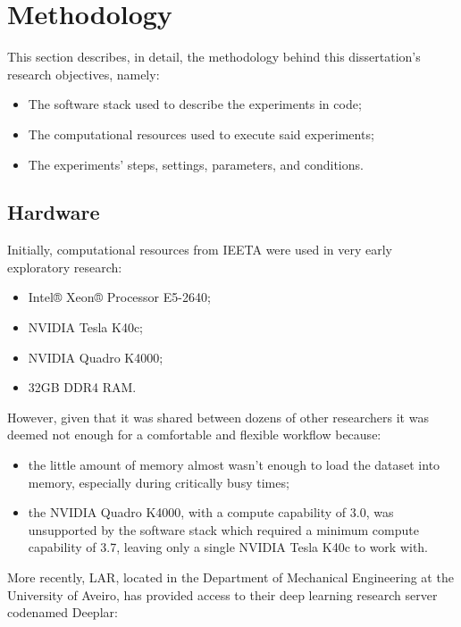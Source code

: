 \chapter{Methodology}
\label{chapter:methodology}

This section describes, in detail, the methodology behind this dissertation's research objectives, namely:

\begin{itemize}
    \item The software stack used to describe the experiments in code;
    \item The computational resources used to execute said experiments;
    \item The experiments' steps, settings, parameters, and conditions.
\end{itemize}

\section{Hardware}

Initially, computational resources from \ac{IEETA} were used in very early exploratory research:

\begin{itemize}
    \item Intel® Xeon® Processor E5-2640;
    \item NVIDIA Tesla K40c;
    \item NVIDIA Quadro K4000;
    \item 32GB DDR4 RAM.
\end{itemize}

However, given that it was shared between dozens of other researchers it was deemed not enough for a comfortable and flexible workflow because:

\begin{itemize}
    \item the little amount of memory almost wasn't enough to load the dataset into memory, especially during critically busy times;
    \item the NVIDIA Quadro K4000, with a compute capability of 3.0, was unsupported by the software stack which required a minimum compute capability of 3.7, leaving only a single NVIDIA Tesla K40c to work with.
\end{itemize}

More recently, \ac{LAR}, located in the Department of Mechanical Engineering at the University of Aveiro, has provided access to their deep learning research server codenamed Deeplar:

